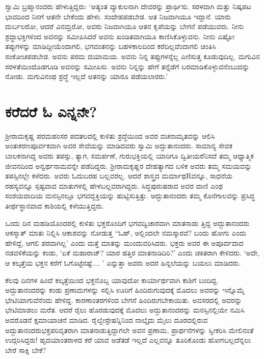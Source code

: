 ಸ್ವಾಮಿ ಬ್ರಹ್ಮಾನಂದರು ಹೇಳುತ್ತಿದ್ದರು: ‘ಅತ್ಯಂತ ವ್ಯಾಕುಲನಾಗಿ ದೇವರನ್ನು ಪ್ರಾರ್ಥಿಸು. ಸರಳವಾಗಿ ಮತ್ತು ನಿಷ್ಕಪಟ ಭಾವದಿಂದ ನಿನಗೆ ಆತನೇ ಬೇಕೆಂದು ಹೇಳು. ಸಂದೇಹಪಡಬೇಡ. ಆತ ನಿಜವಾಗಿಯೂ ಇದ್ದಾನೆ. ಯಾರು ದುರ್ಬಲರೋ, ಆದರೆ ವಿನಮ್ರರೋ, ಅವರು ನಿಜವಾಗಿಯೂ ಆತನ ಕೃಪೆಯನ್ನು ಬೇಗನೆ ಪಡೆಯುವರು. ನೀನು ಶ್ರದ್ಧಾಭಕ್ತಿಗಳಿಂದ ಅವನನ್ನು ಸಮೀಪಿಸಿದರೆ ಅವನು ಖಂಡಿತವಾಗಿಯೂ ಕಾಣಿಸಿಕೊಳ್ಳುವನು. ನೀನು ಎಷ್ಟೋ ತಪ್ಪುಗಳನ್ನು ಮಾಡಿದ್ದೀಯೆಂದಾಗಲಿ, ಭಗವಂತನನ್ನು ಬಹಳಕಾಲದಿಂದ ಕರೆದಿಲ್ಲವೆಂದಾಗಲಿ ಚಿಂತಿಸಿ ಸಂಕೋಚಪಡಬೇಡ. ಅವನು ಪರಮ ದಯಾಮಯ. ಅವನು ನಿನ್ನ ತಪ್ಪುಗಳನ್ನೆಲ್ಲ ಎಣಿಸುತ್ತ ಕೂಡುವುದಿಲ್ಲ. ಮಗುವಿನ ಸರಳತೆಯಿಂದೊಡಗೂಡಿ ಅವನನ್ನು ಸಮೀಪಿಸು. ಅವನು ನಿನ್ನನ್ನು ಹೇಗೆ ತನ್ನೆಡೆಗೆ ಬರಮಾಡಿಕೊಳ್ಳುವನೆಂಬುದನ್ನು ನೋಡು. ಮಗುವಿನಂಥ ಶ್ರದ್ಧೆ ಇಲ್ಲದೆ ಆತನನ್ನು ಯಾರೂ ಪಡೆಯಲಾರರು.’


\section*{ಕರೆದರೆ ಓ ಎನ್ನನೇ?}


ಶ‍್ರೀರಾಮಕೃಷ್ಣ ಪರಮಹಂಸರ ಪದತಲದಲ್ಲಿ ಕುಳಿತು ಶ್ರದ್ಧೆಯಿಂದ ಅವರ ವಚನಾಮೃತವನ್ನು ಆಲಿಸಿ ಅಂತಃಕರಣಪೂರ್ವಕವಾಗಿ ಅವರ ಸೇವೆಯನ್ನು ಮಾಡಿದವರು ಸ್ವಾಮಿ ಅದ್ಭುತಾನಂದರು. ಸಾಮಾನ್ಯ ಸೇವಕ ಬಾಲಕನಾಗಿದ್ದ ಅವರು ತಪಸ್ಸು, ತ್ಯಾಗ, ಸಮರ್ಪಣೆ, ಗುರುಭಕ್ತಿಯಲ್ಲಿ ಯಾರಿಗೂ ದ್ವಿತೀಯರೆನಿಸದೆ ತಮ್ಮ ಆಧ್ಯಾತ್ಮಿಕ ಜೀವನದಿಂದ ಅನ್ವರ್ಥನಾಮವನ್ನೇ ಪಡೆದಿದ್ದರು. ಶ‍್ರೀರಾಮಕೃಷ್ಣರ ದೇಹತ್ಯಾಗದ ಬಳಿಕ ಅವರು ತಮ್ಮ ಸಮಯವನ್ನು ತಪಸ್ಸಿನಲ್ಲೇ ಕಳೆದರು. ಅವರು ಓದುಬರಹ ಬಲ್ಲವರಲ್ಲ. ಆದರೆ ಶಾಸ್ತ್ರದ ಮರ್ಮಾಥRವನ್ನೂ, ಸಾಧನೆಯ ರಹಸ್ಯವನ್ನೂ ಸ್ಪಷ್ಟವಾದ ಮಾತುಗಳಲ್ಲಿ ಹೇಳಬಲ್ಲವರಾಗಿದ್ದರು. ಸಿದ್ಧಪುರುಷರಾದ ಅವರ ವಾಣಿ ಎಂಥ ಸಂಶಯವಾದಿಯ ಮನಸ್ಸಿನಲ್ಲೂ ಭಗವದ್ಭಕ್ತಿಯನ್ನು ಹುಟ್ಟಿಸುತ್ತಿತ್ತು. ಅದ್ಭುತಾನಂದರು ತಮ್ಮ ಕೊನೆಗಾಲವನ್ನು ಪ್ರಸಿದ್ಧ ತೀರ್ಥಸ್ಥಾನವಾದ ಕಾಶಿಯಲ್ಲಿ ಕಳೆಯುತ್ತಿದ್ದರು.

\newpage

ಒಂದು ದಿನ ಮಹಡಿಯೊಂದರಲ್ಲಿ ಕುಳಿತು ಭಕ್ತರೊಂದಿಗೆ ಭಗವದ್ವಿಚಾರವಾಗಿ ಮಾತನಾಡು ತ್ತಿದ್ದ ಅದ್ಭುತಾನಂದರು ಆಕಸ್ಮಾತ್ ಮಾತು ನಿಲ್ಲಿಸಿ ಆಕಾಶವನ್ನು ನೋಡುತ್ತ “ಓಹ್, ಅಲ್ಲಿಂದಲೇ ನಮಸ್ಕಾರವೆ? ಬಂದು ಹೋಗು ಎಂದು ಹೇಳಿದ್ದೆ, ಆಗಲಿ ಪರವಾಗಿಲ್ಲ’ ಎಂದು ಮತ್ತೆ ಮಾತನ್ನು ಮುಂದುವರಿಸಿದರು. ಭಕ್ತರು ಅವರ ಈ ಅಪೂರ್ವವಾದ ನಡವಳಿಕೆಯನ್ನು ಕಂಡು, ‘ಏಕೆ ಮಹಾರಾಜ್​? ಯಾರ ಹತ್ತಿರ ಮಾತನಾಡಿದಿರಿ?’ ಎಂದು ಚಕಿತರಾಗಿ ಕೇಳಿದರು. ‘ಅದೇ, ಆ ಕಲ್ಕತ್ತೆಯ ಭಕ್ತನ ಕರೆಗೆ ಓಗೊಟ್ಟೆನಷ್ಟೆ.... ’ ಎನ್ನುತ್ತಾ ಅವರು ಅದರ ಹಿನ್ನಲೆಯನ್ನು ಬಯಲು ಮಾಡಿದರು.

ಕೆಲವು ದಿನಗಳ ಹಿಂದೆ ಕಲ್ಕತ್ತೆಯಿಂದ ಭಕ್ತನೊಬ್ಬ ಯಾವುದೋ ಕಾರ್ಯಾರ್ಥವಾಗಿ ಕಾಶಿಗೆ ಬಂದಿದ್ದ. ಅದ್ಭುತಾನಂದರನ್ನು ಕಂಡು ಪ್ರಣಾಮಗಳನ್ನು ಸಲ್ಲಿಸಿ ಊರಿಗೆ ಹಿಂದಿರುಗುವುದಕ್ಕೆ ಮೊದಲು ಅವರನ್ನು ಇನ್ನೊಮ್ಮೆ ಭೇಟಿಯಾಗುವೆನೆಂದು ಹೇಳಿದ್ದ. ಕಾರಣಾಂತರಗಳಿಂದ ಬೇಗನೆ ಹಿಂದಿರುಗಬೇಕಾಯಿತು. ಅವಸರದಲ್ಲಿ ಅವರನ್ನು ಭೇಟಿಮಾಡಲು ಮರೆತ. ಆದರೆ ರೈಲು ಹೊರಡುವುದಕ್ಕೆ ಮೊದಲು ಅದ್ಭುತಾನಂದರನ್ನು ಮನಸ್ಸಿನಲ್ಲಿಯೇ ನಮಿಸಿ ಅವರೊಡನೆ ಕ್ಷಮಾ\-ಯಾಚನೆ ಮಾಡಿದ. ರೈಲ್ವೇಸ್ಟೇಷನ್ನಿನಿಂದ ನಾಲ್ಕೈದು ಮೈಲು ದೂರದಲ್ಲಿರುವ \hbox\bgroup ಅದ್ಭುತಾನಂದರು\egroup\break ಭಕ್ತಪರಿವೃತರಾಗಿ ಮಾತನಾಡುತ್ತಿದ್ದಾಗಲೇ ಅವನ ಪ್ರಣಾಮ, ಪ್ರಾರ್ಥನೆಗಳನ್ನು ಸ್ವೀಕರಿಸಿ ಮೇಲಿ\-ನಂತೆ ಉದ್ಗರಿಸಿದ್ದರು! ಹೃದಯಾಂತರಾಳದ ಕರೆ ಯಾವ ಅಡೆತಡೆ ಇಲ್ಲದೆ ಎಲ್ಲವನ್ನೂ ತೂರಿಕೊಂಡು ಹೋಗಬಲ್ಲದೆನ್ನಲು ಬೇರೆ ಸಾಕ್ಷಿ ಬೇಕೆ?

